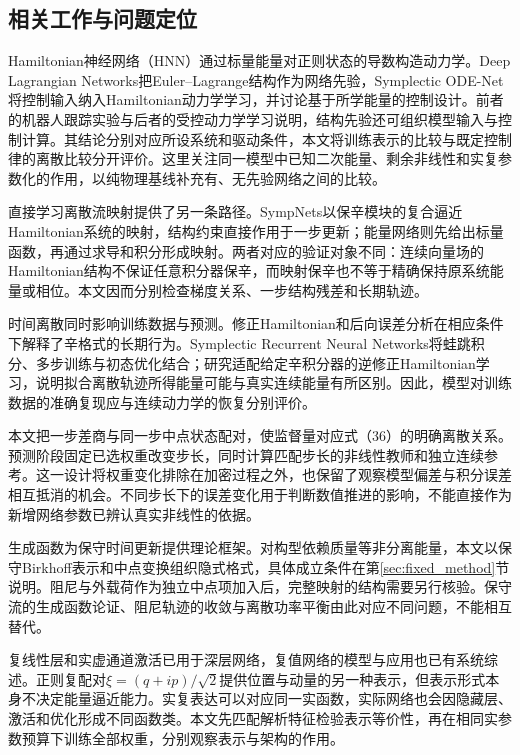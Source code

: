 \subsection{相关工作与问题定位}

Hamiltonian神经网络（HNN）通过标量能量对正则状态的导数构造动力学\citep{Greydanus2019}。Deep Lagrangian Networks把Euler--Lagrange结构作为网络先验\citep{Lutter2019}，Symplectic ODE-Net将控制输入纳入Hamiltonian动力学学习，并讨论基于所学能量的控制设计\citep{Zhong2020}。前者的机器人跟踪实验与后者的受控动力学学习说明，结构先验还可组织模型输入与控制计算。其结论分别对应所设系统和驱动条件，本文将训练表示的比较与既定控制律的离散比较分开评价。这里关注同一模型中已知二次能量、剩余非线性和实复参数化的作用，以纯物理基线补充有、无先验网络之间的比较。

直接学习离散流映射提供了另一条路径。SympNets以保辛模块的复合逼近Hamiltonian系统的映射\citep{Jin2020}，结构约束直接作用于一步更新；能量网络则先给出标量函数，再通过求导和积分形成映射。两者对应的验证对象不同：连续向量场的Hamiltonian结构不保证任意积分器保辛，而映射保辛也不等于精确保持原系统能量或相位。本文因而分别检查梯度关系、一步结构残差和长期轨迹。

时间离散同时影响训练数据与预测。修正Hamiltonian和后向误差分析在相应条件下解释了辛格式的长期行为\citep{Hairer2006}。Symplectic Recurrent Neural Networks将蛙跳积分、多步训练与初态优化结合\citep{Chen2020}；\citet{Offen2022}研究适配给定辛积分器的逆修正Hamiltonian学习，说明拟合离散轨迹所得能量可能与真实连续能量有所区别。因此，模型对训练数据的准确复现应与连续动力学的恢复分别评价。

本文把一步差商与同一步中点状态配对，使监督量对应式（36）的明确离散关系。预测阶段固定已选权重改变步长，同时计算匹配步长的非线性教师和独立连续参考。这一设计将权重变化排除在加密过程之外，也保留了观察模型偏差与积分误差相互抵消的机会。不同步长下的误差变化用于判断数值推进的影响，不能直接作为新增网络参数已辨认真实非线性的依据。

生成函数为保守时间更新提供理论框架\citep[第15章]{FengQin2010}。对构型依赖质量等非分离能量，本文以保守Birkhoff表示和中点变换组织隐式格式，具体成立条件在第\ref{sec:fixed_method}节说明。阻尼与外载荷作为独立中点项加入后，完整映射的结构需要另行核验。保守流的生成函数论证、阻尼轨迹的收敛与离散功率平衡由此对应不同问题，不能相互替代。

复线性层和实虚通道激活已用于深层网络\citep{Trabelsi2018}，复值网络的模型与应用也已有系统综述\citep{Lee2022}。正则复配对$\xi=(q+ip)/\sqrt2$提供位置与动量的另一种表示，但表示形式本身不决定能量逼近能力。实复表达可以对应同一实函数，实际网络也会因隐藏层、激活和优化形成不同函数类。本文先匹配解析特征检验表示等价性，再在相同实参数预算下训练全部权重，分别观察表示与架构的作用。


